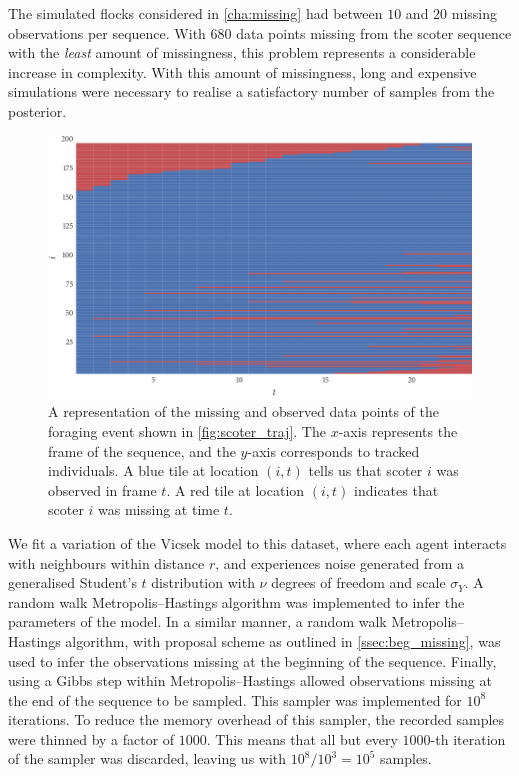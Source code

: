 The simulated flocks considered in \cref{cha:missing} had between $10$ and $20$
missing observations per sequence. With $680$ data points missing from the
scoter sequence with the \emph{least} amount of missingness, this problem
represents a considerable increase in complexity. With this amount of
missingness, long and expensive simulations were necessary to realise a
satisfactory number of samples from the posterior.

\begin{figure}[tb]
  \includegraphics{data_00_missing.pdf}
  \caption{A representation of the missing and observed data points of the
    foraging event shown in \cref{fig:scoter_traj}. The $x$-axis represents the
    frame of the sequence, and the $y$-axis corresponds to tracked individuals. A
    blue tile at location $(i,t)$ tells us that scoter $i$ was observed in frame
    $t$. A red tile at location $(i,t)$ indicates that scoter $i$ was missing at
    time $t$.}
  \label{fig:scoter_missing}
\end{figure}

We fit a variation of the Vicsek model to this dataset, where each agent
interacts with neighbours within distance $r$, and experiences noise generated
from a generalised Student's $t$ distribution with $\nu$ degrees of freedom and
scale $\sigma_Y$. A random walk Metropolis--Hastings algorithm was implemented
to infer the parameters of the model. In a similar manner, a random walk
Metropolis--Hastings algorithm, with proposal scheme as outlined in
\cref{ssec:beg_missing}, was used to infer the observations missing at the
beginning of the sequence. Finally, using a Gibbs step within
Metropolis--Hastings allowed observations missing at the end of the sequence to
be sampled. This sampler was implemented for $10^8$ iterations. To reduce the
memory overhead of this sampler, the recorded samples were thinned by a factor
of $1000$. This means that all but every $1000$-th iteration of the sampler
was discarded, leaving us with $10^8 / 10^3 = 10^5$ samples.

